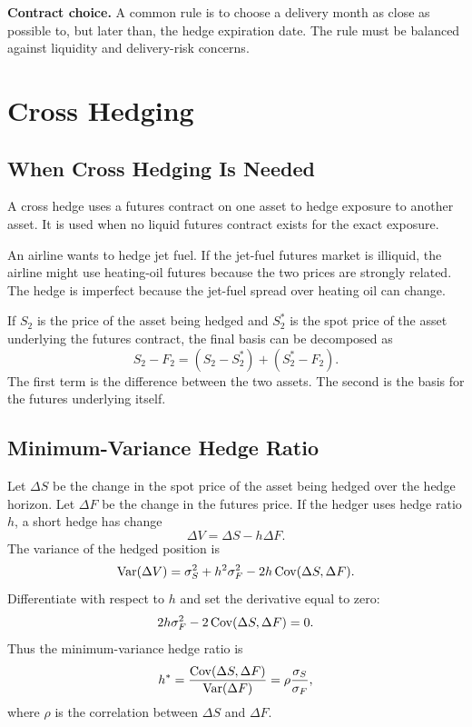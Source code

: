 \begin{boxD}
\textbf{Contract choice.} A common rule is to choose a delivery month as close as
possible to, but later than, the hedge expiration date. The rule must be balanced
against liquidity and delivery-risk concerns.
\end{boxD}

\section{Cross Hedging}

\subsection{When Cross Hedging Is Needed}

A cross hedge uses a futures contract on one asset to hedge exposure to another
asset. It is used when no liquid futures contract exists for the exact exposure.

\begin{exmp}
An airline wants to hedge jet fuel. If the jet-fuel futures market is illiquid,
the airline might use heating-oil futures because the two prices are strongly
related. The hedge is imperfect because the jet-fuel spread over heating oil can
change.
\end{exmp}

If $S_2$ is the price of the asset being hedged and $S_2^*$ is the spot price of
the asset underlying the futures contract, the final basis can be decomposed as
\[
    S_2-F_2=(S_2-S_2^*)+(S_2^*-F_2).
\]
The first term is the difference between the two assets. The second is the basis
for the futures underlying itself.

\subsection{Minimum-Variance Hedge Ratio}

Let $\Delta S$ be the change in the spot price of the asset being hedged over
the hedge horizon. Let $\Delta F$ be the change in the futures price. If the
hedger uses hedge ratio $h$, a short hedge has change
\[
    \Delta V=\Delta S-h\Delta F.
\]
The variance of the hedged position is
\[
    \operatorname{Var}(\Delta V)
    =
    \sigma_S^2+h^2\sigma_F^2-2h\operatorname{Cov}(\Delta S,\Delta F).
\]
Differentiate with respect to $h$ and set the derivative equal to zero:
\[
    2h\sigma_F^2-2\operatorname{Cov}(\Delta S,\Delta F)=0.
\]
Thus the minimum-variance hedge ratio is
\[
    h^*
    =
    \frac{\operatorname{Cov}(\Delta S,\Delta F)}{\operatorname{Var}(\Delta F)}
    =
    \rho\frac{\sigma_S}{\sigma_F},
\]
where $\rho$ is the correlation between $\Delta S$ and $\Delta F$.

